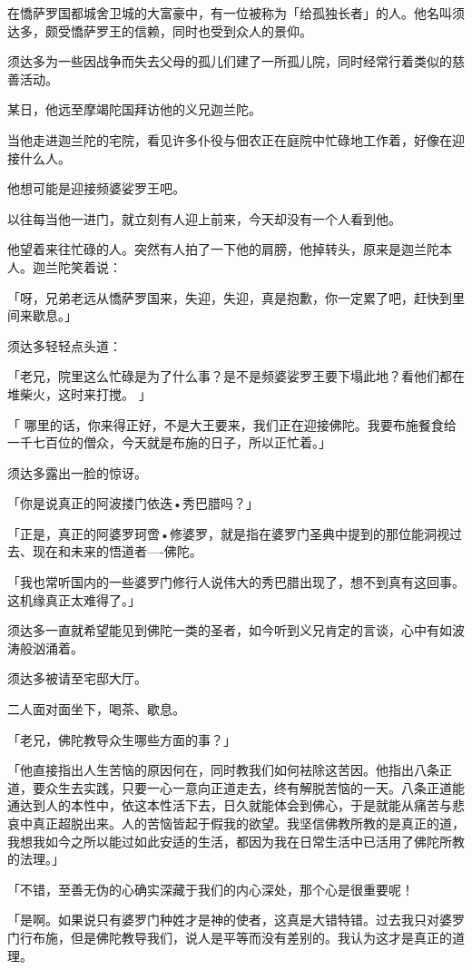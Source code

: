 \documentclass[twoside,openany]{book}
\begin{document}
在憍萨罗国都城舍卫城的大富豪中，有一位被称为「给孤独长者」的人。他名叫须达多，颇受憍萨罗王的信赖，同时也受到众人的景仰。

须达多为一些因战争而失去父母的孤儿们建了一所孤儿院，同时经常行着类似的慈善活动。

某日，他远至摩竭陀国拜访他的义兄迦兰陀。

当他走进迦兰陀的宅院，看见许多仆役与佃农正在庭院中忙碌地工作着，好像在迎接什么人。

他想可能是迎接频婆娑罗王吧。

以往每当他一进门，就立刻有人迎上前来，今天却没有一个人看到他。

他望着来往忙碌的人。突然有人拍了一下他的肩膀，他掉转头，原来是迦兰陀本人。迦兰陀笑着说：

「呀，兄弟老远从憍萨罗国来，失迎，失迎，真是抱歉，你一定累了吧，赶快到里间来歇息。」

须达多轻轻点头道：

「老兄，院里这么忙碌是为了什么事？是不是频婆娑罗王要下塌此地？看他们都在堆柴火，这时来打搅。	」

「 哪里的话，你来得正好，不是大王要来，我们正在迎接佛陀。我要布施餐食给一千七百位的僧众，今天就是布施的日子，所以正忙着。」

须达多露出一脸的惊讶。

「你是说真正的阿波搂门依迭•秀巴腊吗？」

「正是，真正的阿婆罗珂啻•修婆罗，就是指在婆罗门圣典中提到的那位能洞视过去、现在和未来的悟道者----佛陀。

「我也常听国内的一些婆罗门修行人说伟大的秀巴腊出现了，想不到真有这回事。这机缘真正太难得了。」

须达多一直就希望能见到佛陀一类的圣者，如今听到义兄肯定的言谈，心中有如波涛般汹涌着。

须达多被请至宅邸大厅。

二人面对面坐下，喝茶、歇息。

「老兄，佛陀教导众生哪些方面的事？」

「他直接指出人生苦恼的原因何在，同时教我们如何袪除这苦因。他指出八条正道，要众生去实践，只要一心一意向正道走去，终有解脱苦恼的一天。八条正道能通达到人的本性中，依这本性活下去，日久就能体会到佛心，于是就能从痛苦与悲哀中真正超脱出来。人的苦恼皆起于假我的欲望。我坚信佛教所教的是真正的道，我想我如今之所以能过如此安适的生活，都因为我在日常生活中已活用了佛陀所教的法理。」

「不错，至善无伪的心确实深藏于我们的内心深处，那个心是很重要呢！

「是啊。如果说只有婆罗门种姓才是神的使者，这真是大错特错。过去我只对婆罗门行布施，但是佛陀教导我们，说人是平等而没有差别的。我认为这才是真正的道理。
\end{document}
